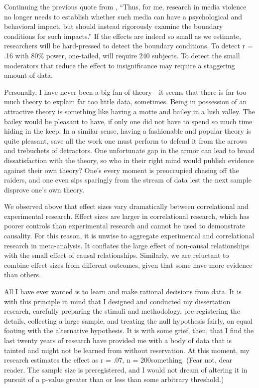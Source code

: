 \documentclass[man]{apa6}
\begin{document}
Continuing the previous quote from \citet[p. 62]{Warburton:2014}, %
``Thus, for me, research in media violence no longer needs to establish whether such media can have a psychological and behavioral impact, but should instead rigorously examine the boundary conditions for such impacts.'' If the effects are indeed so small as we estimate, researchers will be hard-pressed to detect the boundary conditions. To detect r = .16 with 80\% power, one-tailed, will require 240 subjects. To detect the small moderators that reduce the effect to insignificance may require a staggering amount of data.

Personally, I have never been a big fan of theory---it seems that there is far too much theory to explain far too little data, sometimes. Being in possession of an attractive theory is something like having a motte and bailey in a lush valley. The bailey would be pleasant to have, if only one did not have to spend so much time hiding in the keep. In a similar sense, having a fashionable and popular theory is quite pleasant, save all the work one must perform to defend it from the arrows and trebuchets of detractors. One unfortunate gap in the armor can lead to broad dissatisfaction with the theory, so who in their right mind would publish evidence against their own theory? One's every moment is preoccupied chasing off the raiders, and one even sips sparingly from the stream of data lest the next sample disprove one's own theory. %

We observed above that effect sizes vary dramatically between correlational and experimental research. Effect sizes are larger in correlational research, which has poorer controls than experimental research and cannot be used to demonstrate causality. For this reason, it is unwise to aggregate experimental and correlational research in meta-analysis. It conflates the large effect of non-causal relationships with the small effect of causal relationships. Similarly, we are reluctant to combine effect sizes from different outcomes, given that some have more evidence than others. %

All I have ever wanted is to learn and make rational decisions from data. It is with this principle in mind that I designed and conducted my dissertation research, carefully preparing the stimuli and methodology, pre-registering the details, collecting a large sample, and treating the null hypothesis fairly, on equal footing with the alternative hypothesis. It is with some grief, then, that I find the last twenty years of research have provided me with a body of data that is tainted and might not be learned from without reservation. At this moment, my research estimates the effect as r = .07, n = 200something. (Fear not, dear reader. The sample size is preregistered, and I would not dream of altering it in pursuit of a p-value greater than or less than some arbitrary threshold.)
\end{document}
